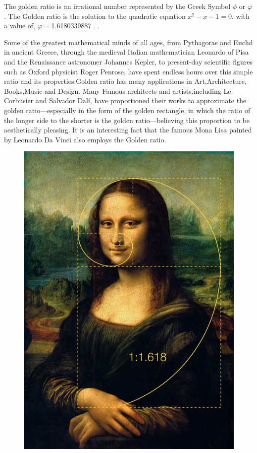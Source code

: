 \documentclass[12pt]{article}
\begin{document}
The golden ratio is an irrational number represented by the Greek Symbol $\phi$ or $\varphi$. The Golden ratio is the solution to the quadratic equation $x^2-x-1=0$. with a value of,
$\varphi=$1.6180339887 . .
\par
Some of the greatest mathematical minds of all ages, from Pythagoras and Euclid in ancient Greece, through the medieval Italian mathematician Leonardo of Pisa and the Renaissance astronomer Johannes Kepler, to present-day scientific figures such as Oxford physicist Roger Penrose, have spent endless hours over this simple ratio and its properties.Golden ratio has many applications in Art,Architecture, Books,Music and Design.
Many Famous architects and artists,including Le Corbusier and Salvador Dalí, have proportioned their works to approximate the golden ratio—especially in the form of the golden rectangle, in which the ratio of the longer side to the shorter is the golden ratio—believing this proportion to be aesthetically pleasing.
It is an interesting fact that the famous Mona Lisa painted by Leonardo Da Vinci also employs the Golden ratio.
\begin{figure}[h]
    \centering
    \includegraphics[scale=0.20]{text.jpg}
\end{figure}
\end{document}
